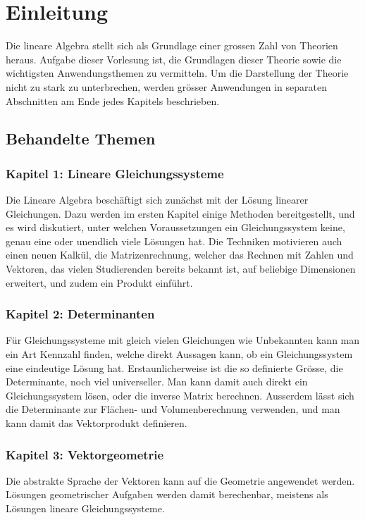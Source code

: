 %
%
%
\chapter*{Einleitung}

Die lineare Algebra stellt sich als Grundlage einer grossen
Zahl von Theorien heraus.
Aufgabe dieser Vorlesung ist, die
Grundlagen dieser Theorie sowie die wichtigsten Anwendungsthemen
zu vermitteln.
Um die Darstellung der Theorie nicht zu stark zu unterbrechen,
werden grösser Anwendungen in separaten Abschnitten am Ende
jedes Kapitels beschrieben.

\section*{Behandelte Themen}
\subsection*{Kapitel 1: Lineare Gleichungssysteme}
Die Lineare Algebra beschäftigt sich zunächst mit der Lösung linearer
Gleichungen.
Dazu werden im ersten Kapitel einige Methoden bereitgestellt,
und es wird diskutiert, unter welchen Voraussetzungen ein
Gleichungssystem keine, genau eine oder unendlich viele
Lösungen hat.
Die Techniken motivieren auch einen neuen Kalkül, die Matrizenrechnung,
welcher das Rechnen mit Zahlen und Vektoren, das vielen
Studierenden bereits bekannt ist, auf beliebige Dimensionen erweitert,
und zudem ein Produkt einführt.

\subsection*{Kapitel 2: Determinanten}
Für Gleichungssysteme mit gleich vielen Gleichungen wie Unbekannten
kann man ein Art Kennzahl finden, welche direkt Aussagen kann,
ob ein Gleichungssystem eine eindeutige Lösung hat.
Erstaunlicherweise ist die so definierte Grösse, die Determinante,
noch viel universeller.
Man kann damit auch direkt ein Gleichungssystem lösen, oder
die inverse Matrix berechnen.
Ausserdem lässt sich die Determinante zur Flächen- und Volumenberechnung
verwenden, und man kann damit das Vektorprodukt definieren.

\subsection*{Kapitel 3: Vektorgeometrie}
Die abstrakte Sprache der Vektoren kann auf die Geometrie angewendet
werden.
Lösungen geometrischer Aufgaben werden damit berechenbar,
meistens als Lösungen lineare Gleichungssysteme.

